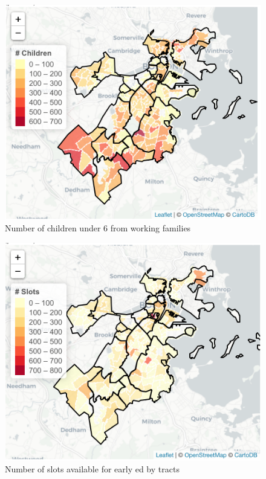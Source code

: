 \documentclass[10pt,letterpaper]{article}
\begin{document}
\begin{figure}

{\centering \includegraphics[width=0.8\linewidth]{fig1_capacitytractdemand} 

}

\caption{Number of children under 6 from working families}\label{fig:unnamed-chunk-4}
\end{figure}

\begin{figure}

{\centering \includegraphics[width=0.8\linewidth]{fig2_capacitytractsupply} 

}

\caption{Number of slots available for early ed by tracts}\label{fig:unnamed-chunk-5}
\end{figure}
\end{document}
